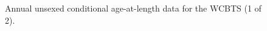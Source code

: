 \documentclass[
]{scrartcl}
\begin{document}
\begin{figure}


\caption{\label{fig-NWFSC_agecomps1}Annual unsexed conditional
age-at-length data for the WCBTS (1 of 2).}

\end{figure}%
\end{document}
